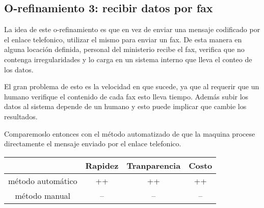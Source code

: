 \subsection{O-refinamiento 3: recibir datos por fax}

La idea de este o-refinamiento es que en vez de enviar una mensaje codificado por el enlace telefonico, utilizar el mismo para enviar un fax. De esta manera en alguna locación definida, personal del ministerio recibe el fax, verifica que no contenga irregularidades y lo carga en un sistema interno que lleva el conteo de los datos.

El gran problema de esto es la velocidad en que sucede, ya que al requerir que un humano verifique el contenido de cada fax esto lleva tiempo. Además subir los datos al sistema depende de un humano y esto puede implicar que cambie los resultados.

Comparemoslo entonces con el método automatizado de que la maquina procese directamente el mensaje enviado por el enlace telefonico.

\begin{table}[H]
\centering
 \begin{tabular}{|c | c | c | c|} 
 \hline
 & Rapidez & Tranparencia & Costo \\
 \hline
 método automático & ++ & ++  & ++ \\
 \hline
 método manual & -- & -- & -- \\
 \hline
 
 \end{tabular}
\end{table}